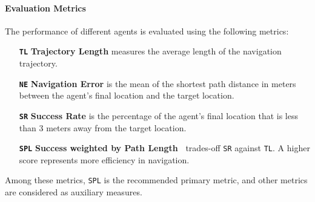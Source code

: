 \documentclass[10pt,twocolumn,letterpaper]{article}
\begin{document}
\paragraph{Evaluation Metrics}
The performance of different agents is evaluated using the following metrics:
\begin{itemize}[noitemsep,topsep=2pt] \item[\textbf{\texttt{TL}}] \textbf{Trajectory Length} measures the average length of the navigation trajectory.
\item[\textbf{\texttt{NE}}] \textbf{Navigation Error} is the mean of the shortest path distance in meters between the agent's final location and the target location. 
\item[\textbf{\texttt{SR}}] \textbf{Success Rate} is the percentage of the agent's final location that is less than 3 meters away from the target location.
\item[\textbf{\texttt{SPL}}] \textbf{Success weighted by Path Length~\cite{anderson2018evaluation}} trades-off \texttt{SR} against \texttt{TL}. A higher score represents more efficiency in navigation.
\end{itemize}
Among these metrics, \texttt{SPL} is the recommended primary metric, and other metrics are considered as auxiliary measures.
\end{document}
